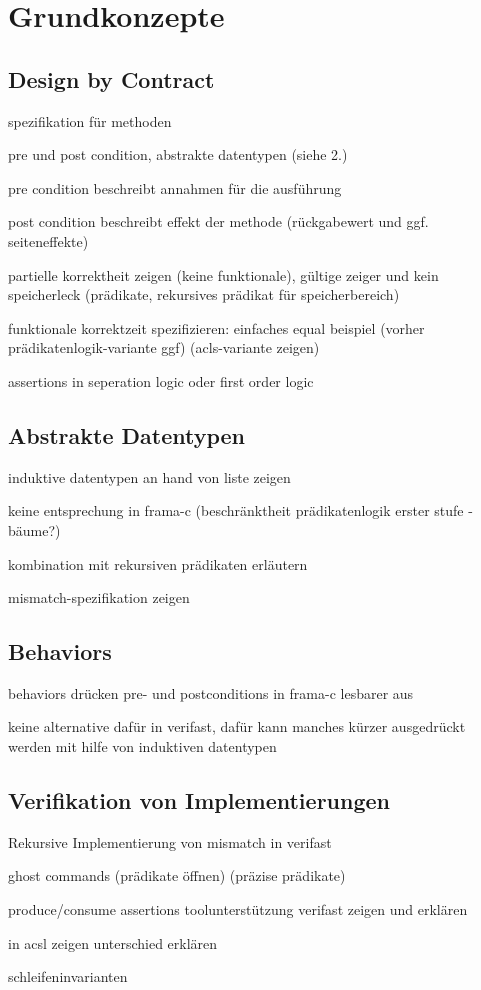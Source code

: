 ﻿
\chapter{Grundkonzepte}

\section{Design by Contract}
\label{sec:design-by-contract}

spezifikation für methoden 


pre und post condition, abstrakte datentypen (siehe 2.)
  
  
pre condition beschreibt annahmen für die ausführung
  
  
post condition beschreibt effekt der methode 
  (rückgabewert und ggf. seiteneffekte)

  
partielle korrektheit zeigen (keine funktionale), gültige zeiger und kein speicherleck
(prädikate, rekursives prädikat für speicherbereich)
  
funktionale korrektzeit spezifizieren: einfaches equal beispiel 
(vorher prädikatenlogik-variante ggf)
(acls-variante zeigen)


assertions in seperation logic oder first order logic


\section{Abstrakte Datentypen}

induktive datentypen an hand von liste zeigen


keine entsprechung in frama-c (beschränktheit prädikatenlogik erster stufe - bäume?)


kombination mit rekursiven prädikaten erläutern


mismatch-spezifikation zeigen


\section{Behaviors}


behaviors drücken pre- und postconditions in frama-c lesbarer aus


keine alternative dafür in verifast, dafür kann manches kürzer ausgedrückt werden mit hilfe von induktiven datentypen


\section{Verifikation von Implementierungen}

Rekursive Implementierung von mismatch
in verifast

ghost commands
(prädikate öffnen)
(präzise prädikate)


produce/consume assertions
toolunterstützung verifast zeigen und erklären


in acsl zeigen
unterschied erklären


schleifeninvarianten


